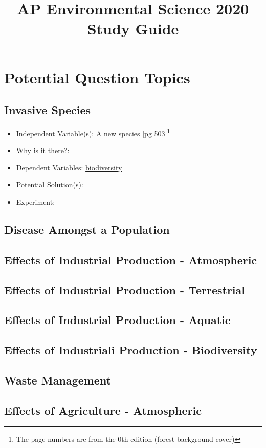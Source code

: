 \documentclass[11pt]{article}
\title{AP Environmental Science 2020 Study Guide}
\begin{document}
\maketitle

\section{Potential Question Topics}
\subsection{Invasive Species}
{\renewcommand\labelitemi{}
\begin{itemize}
	\item Independent Variable(s): A new species [pg 503]\footnote[1]{The page numbers are from the 0th edition (forest background cover)}
	\item Why is it there?:
	\item Dependent Variables: \hyperlink{unit 2}{biodiversity}
	\item Potential Solution(s):
	\item Experiment:
\end{itemize}}
\subsection{Disease Amongst a Population}
\subsection{Effects of Industrial Production - Atmospheric}
\subsection{Effects of Industrial Production - Terrestrial}
\subsection{Effects of Industrial Production - Aquatic}
\subsection{Effects of Industriali Production - Biodiversity}
\subsection{Waste Management}
\subsection{Effects of Agriculture - Atmospheric}
\end{document}
